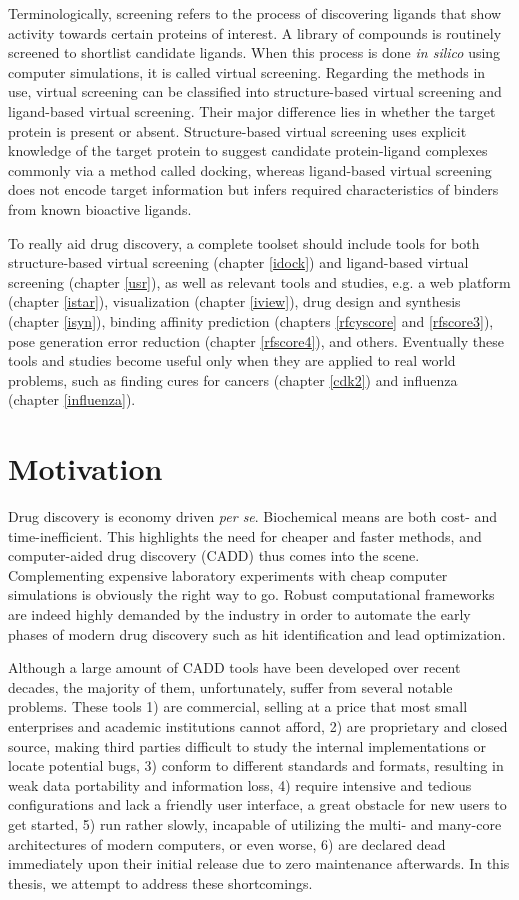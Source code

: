 Terminologically, screening refers to the process of discovering ligands that show activity towards certain proteins of interest. A library of compounds is routinely screened to shortlist candidate ligands. When this process is done \textit{in silico} using computer simulations, it is called virtual screening. Regarding the methods in use, virtual screening can be classified into structure-based virtual screening and ligand-based virtual screening. Their major difference lies in whether the target protein is present or absent. Structure-based virtual screening uses explicit knowledge of the target protein to suggest candidate protein-ligand complexes commonly via a method called docking, whereas ligand-based virtual screening does not encode target information but infers required characteristics of binders from known bioactive ligands.

To really aid drug discovery, a complete toolset should include tools for both structure-based virtual screening (chapter \ref{idock}) and ligand-based virtual screening (chapter \ref{usr}), as well as relevant tools and studies, e.g. a web platform (chapter \ref{istar}), visualization (chapter \ref{iview}), drug design and synthesis (chapter \ref{isyn}), binding affinity prediction (chapters \ref{rfcyscore} and \ref{rfscore3}), pose generation error reduction (chapter \ref{rfscore4}), and others. Eventually these tools and studies become useful only when they are applied to real world problems, such as finding cures for cancers (chapter \ref{cdk2}) and influenza (chapter \ref{influenza}).

\section{Motivation}

Drug discovery is economy driven \textit{per se}. Biochemical means are both cost- and time-inefficient. This highlights the need for cheaper and faster methods, and computer-aided drug discovery (CADD) thus comes into the scene. Complementing expensive laboratory experiments with cheap computer simulations is obviously the right way to go. Robust computational frameworks are indeed highly demanded by the industry in order to automate the early phases of modern drug discovery such as hit identification and lead optimization.

Although a large amount of CADD tools have been developed over recent decades, the majority of them, unfortunately, suffer from several notable problems. These tools 1) are commercial, selling at a price that most small enterprises and academic institutions cannot afford, 2) are proprietary and closed source, making third parties difficult to study the internal implementations or locate potential bugs, 3) conform to different standards and formats, resulting in weak data portability and information loss, 4) require intensive and tedious configurations and lack a friendly user interface, a great obstacle for new users to get started, 5) run rather slowly, incapable of utilizing the multi- and many-core architectures of modern computers, or even worse, 6) are declared dead immediately upon their initial release due to zero maintenance afterwards. In this thesis, we attempt to address these shortcomings.

